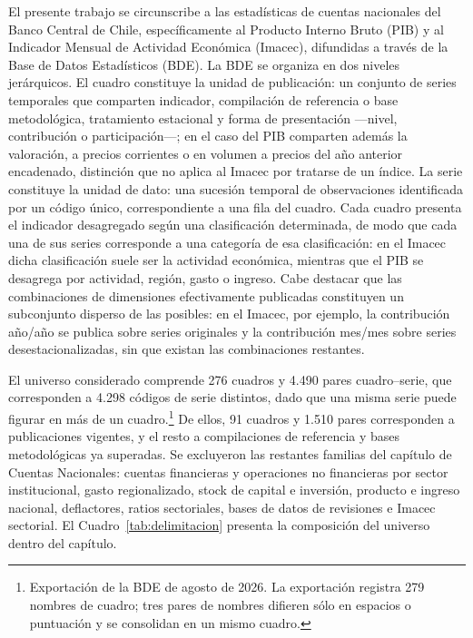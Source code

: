 \documentclass[11pt]{article}
\begin{document}
El presente trabajo se circunscribe a las estadísticas de cuentas nacionales del
Banco Central de Chile, específicamente al Producto Interno Bruto (PIB) y al
Indicador Mensual de Actividad Económica (Imacec), difundidas a través de la Base de
Datos Estadísticos (BDE). La BDE se organiza en dos niveles jerárquicos. El cuadro
constituye la unidad de publicación: un conjunto de series temporales que comparten
indicador, compilación de referencia o base metodológica, tratamiento estacional y
forma de presentación ---nivel, contribución o participación---; en el caso del PIB
comparten además la valoración, a precios corrientes o en volumen a precios del año
anterior encadenado, distinción que no aplica al Imacec por tratarse de un índice. La
serie constituye la unidad de dato: una sucesión temporal de observaciones
identificada por un código único, correspondiente a una fila del cuadro. Cada cuadro
presenta el indicador desagregado según una clasificación determinada, de modo que
cada una de sus series corresponde a una categoría de esa clasificación: en el Imacec
dicha clasificación suele ser la actividad económica, mientras que el PIB se
desagrega por actividad, región, gasto o ingreso. Cabe destacar que las
combinaciones de dimensiones efectivamente publicadas constituyen un subconjunto
disperso de las posibles: en el Imacec, por ejemplo, la contribución año/año se
publica sobre series originales y la contribución mes/mes sobre series
desestacionalizadas, sin que existan las combinaciones restantes.

El universo considerado comprende 276 cuadros y 4.490 pares cuadro--serie, que
corresponden a 4.298 códigos de serie distintos, dado que una misma serie puede
figurar en más de un cuadro.\footnote{Exportación de la BDE de agosto de 2026. La
exportación registra 279 nombres de cuadro; tres pares de nombres difieren sólo en
espacios o puntuación y se consolidan en un mismo cuadro.} De ellos, 91 cuadros y
1.510 pares corresponden a publicaciones vigentes, y el resto a compilaciones de
referencia y bases metodológicas ya superadas. Se excluyeron las restantes familias
del capítulo de Cuentas Nacionales: cuentas financieras y operaciones no
financieras por sector institucional, gasto regionalizado, stock de capital e
inversión, producto e ingreso nacional, deflactores, ratios sectoriales, bases de
datos de revisiones e Imacec sectorial. El Cuadro~\ref{tab:delimitacion} presenta
la composición del universo dentro del capítulo.
\end{document}
